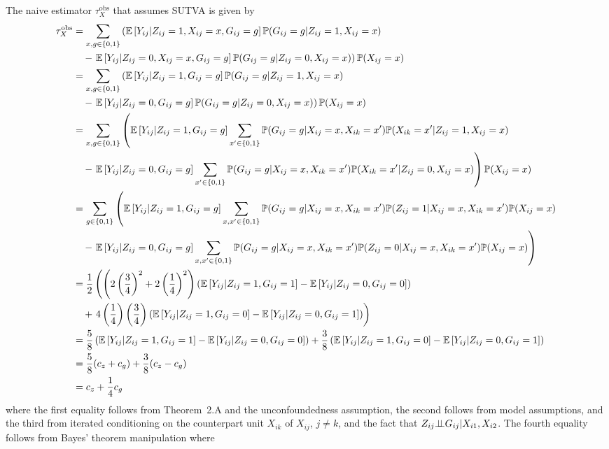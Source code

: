 \documentclass[10pt]{article}
\begin{document}
The naive estimator $\tau_{X}^\text{obs}$ that assumes SUTVA is given by
\begin{align*}
\tau_{X}^\text{obs} &= \sum_{x,g\in\{0,1\}}\left(\mathbb{E}\left[Y_{ij}|Z_{ij}=1,X_{ij}=x,G_{ij}=g\right]\mathbb{P}(G_{ij}=g|Z_{ij}=1,X_{ij}=x)\right. \\
&\quad - \left.\mathbb{E}\left[Y_{ij}|Z_{ij}=0,X_{ij}=x,G_{ij}=g\right]\mathbb{P}(G_{ij}=g|Z_{ij}=0,X_{ij}=x)\right)\mathbb{P}(X_{ij}=x) \\
&= \sum_{x,g\in\{0,1\}}\left(\mathbb{E}\left[Y_{ij}|Z_{ij}=1,G_{ij}=g\right]\mathbb{P}(G_{ij}=g|Z_{ij}=1,X_{ij}=x)\right. \\
&\quad - \left.\mathbb{E}\left[Y_{ij}|Z_{ij}=0,G_{ij}=g\right]\mathbb{P}(G_{ij}=g|Z_{ij}=0,X_{ij}=x)\right)\mathbb{P}(X_{ij}=x) \\
&= \sum_{x,g\in\{0,1\}}\left(\mathbb{E}\left[Y_{ij}|Z_{ij}=1,G_{ij}=g\right]\sum_{x'\in\{0,1\}}\mathbb{P}(G_{ij}=g|X_{ij}=x,X_{ik}=x')\mathbb{P}(X_{ik}=x'|Z_{ij}=1,X_{ij}=x)\right. \\
&\quad - \left.\mathbb{E}\left[Y_{ij}|Z_{ij}=0,G_{ij}=g\right]\sum_{x'\in\{0,1\}}\mathbb{P}(G_{ij}=g|X_{ij}=x,X_{ik}=x')\mathbb{P}(X_{ik}=x'|Z_{ij}=0,X_{ij}=x)\right)\mathbb{P}(X_{ij}=x) \\
&= \sum_{g\in\{0,1\}}\left(\mathbb{E}\left[Y_{ij}|Z_{ij}=1,G_{ij}=g\right]\sum_{x,x'\in\{0,1\}}\mathbb{P}(G_{ij}=g|X_{ij}=x,X_{ik}=x')\mathbb{P}(Z_{ij}=1|X_{ij}=x,X_{ik}=x')\mathbb{P}(X_{ij}=x)\right. \\
&\quad - \left.\mathbb{E}\left[Y_{ij}|Z_{ij}=0,G_{ij}=g\right]\sum_{x,x'\in\{0,1\}}\mathbb{P}(G_{ij}=g|X_{ij}=x,X_{ik}=x')\mathbb{P}(Z_{ij}=0|X_{ij}=x,X_{ik}=x')\mathbb{P}(X_{ij}=x)\right) \\
&= \frac{1}{2}\left(\left(2\left(\frac{3}{4}\right)^2+2\left(\frac{1}{4}\right)^2\right)\left(\mathbb{E}\left[Y_{ij}|Z_{ij}=1,G_{ij}=1\right]-\mathbb{E}\left[Y_{ij}|Z_{ij}=0,G_{ij}=0\right]\right)\right. \\
&\quad + \left.4\left(\frac{1}{4}\right)\left(\frac{3}{4}\right)\left(\mathbb{E}\left[Y_{ij}|Z_{ij}=1,G_{ij}=0\right]-\mathbb{E}\left[Y_{ij}|Z_{ij}=0,G_{ij}=1\right]\right)\right) \\
&= \frac{5}{8}\left(\mathbb{E}\left[Y_{ij}|Z_{ij}=1,G_{ij}=1\right]-\mathbb{E}\left[Y_{ij}|Z_{ij}=0,G_{ij}=0\right]\right) + \frac{3}{8}\left(\mathbb{E}\left[Y_{ij}|Z_{ij}=1,G_{ij}=0\right]-\mathbb{E}\left[Y_{ij}|Z_{ij}=0,G_{ij}=1\right]\right) \\
&= \frac{5}{8}(c_z+c_g) + \frac{3}{8}(c_z-c_g) \\
&= c_z + \frac{1}{4}c_g
\end{align*}
where the first equality follows from Theorem~2.A and the unconfoundedness assumption, the second follows from model assumptions, and the third from iterated conditioning on the counterpart unit $X_{ik}$ of $X_{ij}$, $j\neq k$, and the fact that $Z_{ij}{\perp\!\!\!\perp} G_{ij}|X_{i1},X_{i2}$.  The fourth equality follows from Bayes' theorem manipulation where
\end{document}
